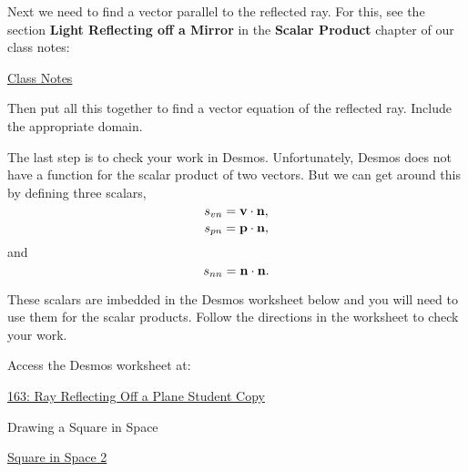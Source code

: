 \documentclass{ximera}
\begin{document}
\begin{question}
\begin{itemize}
\end{itemize}

Next we need to find a vector parallel to the reflected ray. For this, see the section {\bf Light Reflecting off a Mirror} in the {\bf Scalar Product} chapter of our class notes:

\href{https://ximera.osu.edu/calc3/Calculus3/ScalarProduct/ScalarProduct}{Class Notes}

Then put all this together to find a vector equation of the reflected ray. Include the appropriate domain.

The last step is to check your work in Desmos. Unfortunately, Desmos does not have a function for the scalar product of two vectors. But we can get around this by defining three scalars,
\[
    s_{vn} = {\bf v}\cdot {\bf n} ,
\]
\[
    s_{pn} =  {\bf p}\cdot {\bf n},
\]
and 
\[
       s_{nn} =  {\bf n}\cdot {\bf n} .
\]

These scalars are imbedded in the Desmos worksheet below and you will need to use them for the scalar products. Follow the directions in the worksheet to check your work. 


Access the Desmos worksheet at:

\href{https://www.desmos.com/3d/85f82721d5}{163: Ray Reflecting Off a Plane Student Copy}



\end{question}



Drawing a Square in Space

\href{https://www.desmos.com/3d/3a19b63ef0}{Square in Space 2}
\end{document}
